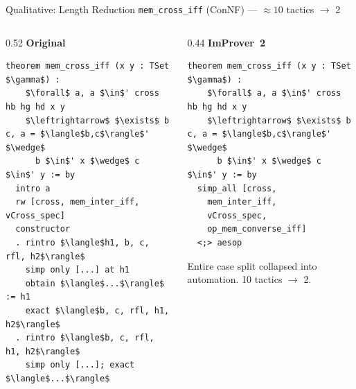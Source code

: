 \begin{frame}[fragile]{Qualitative: Length Reduction}
\vspace{0.2em}
{\small \texttt{mem\_cross\_iff} (ConNF) --- $\approx 10$ tactics $\to$ 2}
\begin{columns}[T]
\begin{column}{0.52\textwidth}
\textbf{Original}
\begin{lstlisting}[basicstyle=\scriptsize\ttfamily]
theorem mem_cross_iff (x y : TSet $\gamma$) :
    $\forall$ a, a $\in$' cross hb hg hd x y
    $\leftrightarrow$ $\exists$ b c, a = $\langle$b,c$\rangle$' $\wedge$
      b $\in$' x $\wedge$ c $\in$' y := by
  intro a
  rw [cross, mem_inter_iff, vCross_spec]
  constructor
  . rintro $\langle$h1, b, c, rfl, h2$\rangle$
    simp only [...] at h1
    obtain $\langle$...$\rangle$ := h1
    exact $\langle$b, c, rfl, h1, h2$\rangle$
  . rintro $\langle$b, c, rfl, h1, h2$\rangle$
    simp only [...]; exact $\langle$...$\rangle$
\end{lstlisting}
\end{column}
\begin{column}{0.44\textwidth}
\textbf{ImProver~2}
\begin{lstlisting}[basicstyle=\scriptsize\ttfamily]
theorem mem_cross_iff (x y : TSet $\gamma$) :
    $\forall$ a, a $\in$' cross hb hg hd x y
    $\leftrightarrow$ $\exists$ b c, a = $\langle$b,c$\rangle$' $\wedge$
      b $\in$' x $\wedge$ c $\in$' y := by
  simp_all [cross,
    mem_inter_iff,
    vCross_spec,
    op_mem_converse_iff]
  <;> aesop
\end{lstlisting}
\vspace{0.4em}
\small Entire case split collapsed into automation. 10 tactics $\to$ 2.
\end{column}
\end{columns}
\end{frame}

